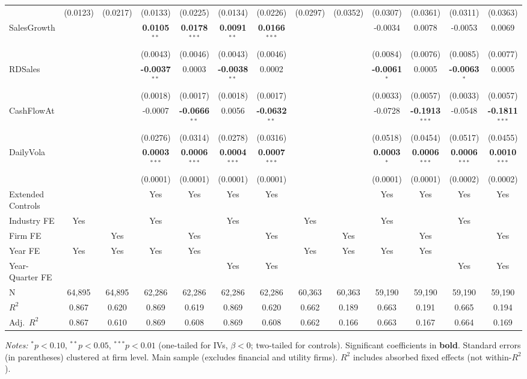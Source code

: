 \documentclass[11pt,a4paper]{article}
\begin{document}
\begin{table}[htbp]
\begin{tabular}{lcccccccccccc}
 & (0.0123) & (0.0217) & (0.0133) & (0.0225) & (0.0134) & (0.0226) & (0.0297) & (0.0352) & (0.0307) & (0.0361) & (0.0311) & (0.0363) \\
SalesGrowth &  &  & \textbf{0.0105}$^{**}$ & \textbf{0.0178}$^{***}$ & \textbf{0.0091}$^{**}$ & \textbf{0.0166}$^{***}$ &  &  & -0.0034 & 0.0078 & -0.0053 & 0.0069 \\
 &  &  & (0.0043) & (0.0046) & (0.0043) & (0.0046) &  &  & (0.0084) & (0.0076) & (0.0085) & (0.0077) \\
RDSales &  &  & \textbf{-0.0037}$^{**}$ & 0.0003 & \textbf{-0.0038}$^{**}$ & 0.0002 &  &  & \textbf{-0.0061}$^{*}$ & 0.0005 & \textbf{-0.0063}$^{*}$ & 0.0005 \\
 &  &  & (0.0018) & (0.0017) & (0.0018) & (0.0017) &  &  & (0.0033) & (0.0057) & (0.0033) & (0.0057) \\
CashFlowAt &  &  & -0.0007 & \textbf{-0.0666}$^{**}$ & 0.0056 & \textbf{-0.0632}$^{**}$ &  &  & -0.0728 & \textbf{-0.1913}$^{***}$ & -0.0548 & \textbf{-0.1811}$^{***}$ \\
 &  &  & (0.0276) & (0.0314) & (0.0278) & (0.0316) &  &  & (0.0518) & (0.0454) & (0.0517) & (0.0455) \\
DailyVola &  &  & \textbf{0.0003}$^{***}$ & \textbf{0.0006}$^{***}$ & \textbf{0.0004}$^{***}$ & \textbf{0.0007}$^{***}$ &  &  & \textbf{0.0003}$^{*}$ & \textbf{0.0006}$^{***}$ & \textbf{0.0006}$^{***}$ & \textbf{0.0010}$^{***}$ \\
 &  &  & (0.0001) & (0.0001) & (0.0001) & (0.0001) &  &  & (0.0001) & (0.0001) & (0.0002) & (0.0002) \\
\midrule
Extended Controls &  &  & Yes & Yes & Yes & Yes &  &  & Yes & Yes & Yes & Yes \\
Industry FE & Yes &  & Yes &  & Yes &  & Yes &  & Yes &  & Yes &  \\
Firm FE &  & Yes &  & Yes &  & Yes &  & Yes &  & Yes &  & Yes \\
Year FE & Yes & Yes & Yes & Yes &  &  & Yes & Yes & Yes & Yes &  &  \\
Year-Quarter FE &  &  &  &  & Yes & Yes &  &  &  &  & Yes & Yes \\
\midrule
N & 64,895 & 64,895 & 62,286 & 62,286 & 62,286 & 62,286 & 60,363 & 60,363 & 59,190 & 59,190 & 59,190 & 59,190 \\
$R^2$ & 0.867 & 0.620 & 0.869 & 0.619 & 0.869 & 0.620 & 0.662 & 0.189 & 0.663 & 0.191 & 0.665 & 0.194 \\
Adj.~$R^2$ & 0.867 & 0.610 & 0.869 & 0.608 & 0.869 & 0.608 & 0.662 & 0.166 & 0.663 & 0.167 & 0.664 & 0.169 \\
\bottomrule
\end{tabular}
\begin{minipage}{\linewidth}
\vspace{2pt}\scriptsize
\textit{Notes:} $^{*}p<0.10$, $^{**}p<0.05$, $^{***}p<0.01$ (one-tailed for IVs, $\beta < 0$; two-tailed for controls).
 Significant coefficients in \textbf{bold}.
 Standard errors (in parentheses) clustered at firm level.
 Main sample (excludes financial and utility firms).
 $R^2$ includes absorbed fixed effects (not within-$R^2$).
\end{minipage}
\end{table}
\end{document}
